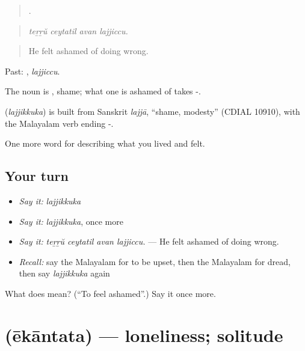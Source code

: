 \begin{quote}
   .
\end{quote}

\begin{quote}
\emph{teṟṟŭ ceytatil avan lajjiccu.}
\end{quote}

\begin{quote}
He felt ashamed of doing wrong.
\end{quote}

Past: , \emph{lajjiccu}.

The noun is , shame; what one is ashamed of takes -.

\begin{cousinweb}
\textbf{} (\emph{lajjikkuka}) is built from Sanskrit \emph{lajjā}, \textquotedblleft{}shame, modesty\textquotedblright{} (CDIAL 10910), with the Malayalam verb ending -.
\end{cousinweb}

\begin{grammarlens}[title={What you've built}]
One more word for describing what you lived and felt.
\end{grammarlens}

\subsection*{Your turn}
\begin{itemize}
\raggedright
  \item \emph{Say it:} \emph{lajjikkuka}
  \item \emph{Say it:} \emph{lajjikkuka}, once more
  \item \emph{Say it:} \emph{teṟṟŭ ceytatil avan lajjiccu.} — He felt ashamed of doing wrong.
  \item \emph{Recall:} say the Malayalam for to be upset, then the Malayalam for dread, then say \emph{lajjikkuka} again
\end{itemize}

\begin{tcolorbox}[breakable,colback=teal!4,colframe=teal!35!black,title={Before you move on}]
What does  mean? (\textquotedblleft{}To feel ashamed\textquotedblright{}.) Say it once more.
\end{tcolorbox}
\section[\texorpdfstring{\ml{ഏകാന്തത} (ēkāntata)}{ഏകാന്തത (ēkāntata)}]{ (ēkāntata) — loneliness; solitude}

